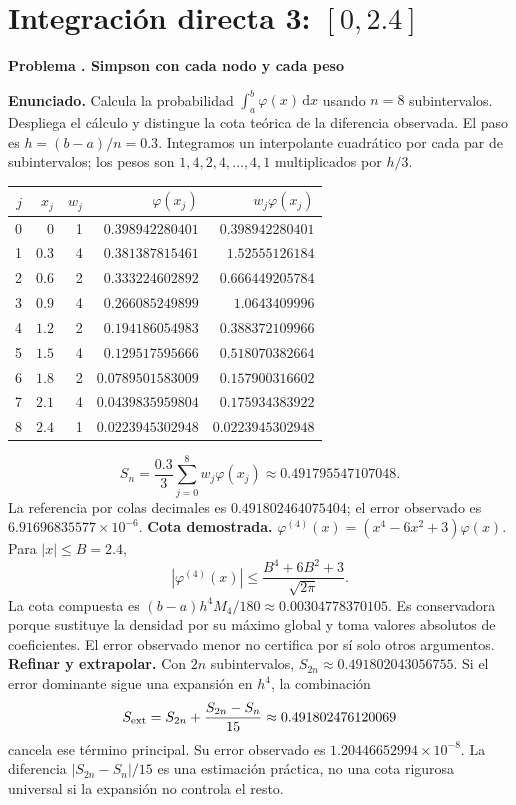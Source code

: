 \documentclass[11pt,a4paper]{article}
\newcommand{\dd}{\,\mathrm d}
\theoremstyle{definition}
\newcounter{problema}
\newenvironment{resuelto}[1]{\refstepcounter{problema}\par\medskip\Needspace{6\baselineskip}\textbf{Problema \theproblema. #1}\par}{\par\medskip}
\begin{document}
\section{\texorpdfstring{Integración directa 3: $[0,2.4]$}{Integración directa 3: [0,2.4]}}
\begin{resuelto}{Simpson con cada nodo y cada peso}
\textbf{Enunciado.} Calcula la probabilidad $\int_a^b\varphi(x)\dd x$ usando $n=8$ subintervalos. Despliega el cálculo y distingue la cota teórica de la diferencia observada.
El paso es $h=(b-a)/n=0.3$. Integramos un interpolante cuadrático por cada par de subintervalos; los pesos son $1,4,2,4,\ldots,4,1$ multiplicados por $h/3$.

\begin{center}\small\begin{tabular}{rrrrr}
\toprule
$j$&$x_j$&$w_j$&$\varphi(x_j)$&$w_j\varphi(x_j)$\\
\midrule
0&$0$&1&$0.398942280401$&$0.398942280401$\\
1&$0.3$&4&$0.381387815461$&$1.52555126184$\\
2&$0.6$&2&$0.333224602892$&$0.666449205784$\\
3&$0.9$&4&$0.266085249899$&$1.0643409996$\\
4&$1.2$&2&$0.194186054983$&$0.388372109966$\\
5&$1.5$&4&$0.129517595666$&$0.518070382664$\\
6&$1.8$&2&$0.0789501583009$&$0.157900316602$\\
7&$2.1$&4&$0.0439835959804$&$0.175934383922$\\
8&$2.4$&1&$0.0223945302948$&$0.0223945302948$\\
\bottomrule\end{tabular}\end{center}
\[
S_n=\frac{0.3}{3}\sum_{j=0}^{8}w_j\varphi(x_j)\approx0.491795547107048.
\]
La referencia por colas decimales es $0.491802464075404$; el error observado es $6.91696835577\times10^{-6}$.
\textbf{Cota demostrada.} $\varphi^{(4)}(x)=(x^4-6x^2+3)\varphi(x)$. Para $|x|\le B=2.4$,
\[
|\varphi^{(4)}(x)|\le\frac{B^4+6B^2+3}{\sqrt{2\pi}}.
\]
La cota compuesta es $(b-a)h^4M_4/180\approx0.00304778370105$. Es conservadora porque sustituye la densidad por su máximo global y toma valores absolutos de coeficientes. El error observado menor no certifica por sí solo otros argumentos.
\textbf{Refinar y extrapolar.} Con $2n$ subintervalos, $S_{2n}\approx0.491802043056755$. Si el error dominante sigue una expansión en $h^4$, la combinación
\[
S_{\rm ext}=S_{2n}+\frac{S_{2n}-S_n}{15}\approx0.491802476120069
\]
cancela ese término principal. Su error observado es $1.20446652994\times10^{-8}$. La diferencia $|S_{2n}-S_n|/15$ es una estimación práctica, no una cota rigurosa universal si la expansión no controla el resto.
\end{resuelto}
\end{document}
